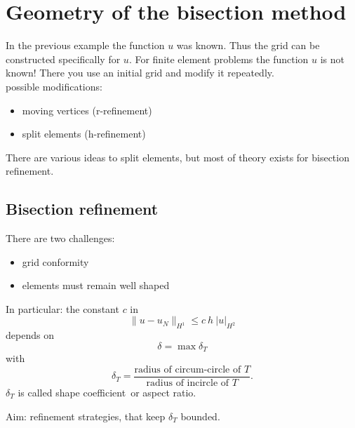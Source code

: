 
\chapter{Geometry of the bisection method}
In the previous example the function $u$ was known. Thus the grid can be constructed specifically for $u$. For finite element problems the function $u $ is not known! There you use an initial grid and modify it repeatedly.\\
possible modifications:
\begin{itemize}
	\item moving vertices (r-refinement)
	\item split elements (h-refinement)
\end{itemize} 
There are various ideas to split elements, but most of theory exists for bisection refinement.
\section{Bisection refinement}

There are two challenges:
\begin{itemize}
	\item grid conformity
	\item elements must remain \glqq well shaped\grqq 
\end{itemize} 
In particular: the constant $c$ in 
\begin{equation*}
	\|u - u_{N}\|_{H^{1}} \leq c\ h\ |u|_{H^{2}}
\end{equation*} 
depends on 
\begin{equation*}
	\delta = \max \delta_{T} 
\end{equation*} 
with
\begin{equation*}
	\delta_{T}= \frac{\text{radius of circum-circle of }T}{\text{radius of incircle of }T}.
\end{equation*} 
$\delta_{T}$ is called \glqq shape coefficient\grqq\ or \glqq aspect ratio\grqq.\\
\par 
Aim: refinement strategies, that keep $\delta_{T}$ bounded.

